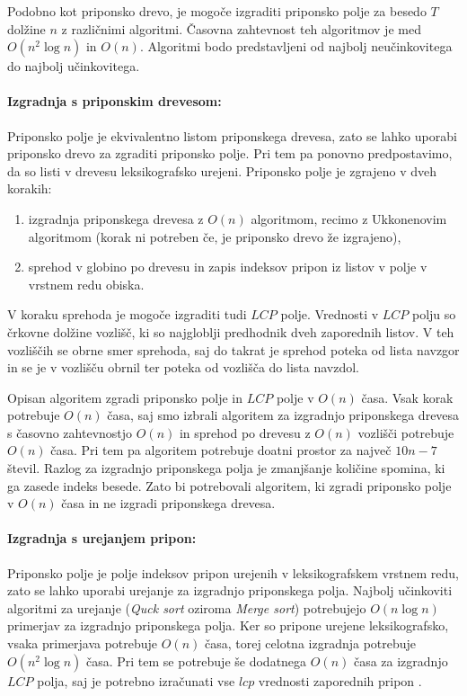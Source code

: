 Podobno kot priponsko drevo, je mogoče izgraditi priponsko polje za besedo $T$ dolžine $n$ z različnimi algoritmi. Časovna zahtevnost teh algoritmov je med $O(n^2\log{n})$ in $O(n)$. Algoritmi bodo predstavljeni od najbolj neučinkovitega do najbolj učinkovitega.

\paragraph{Izgradnja s priponskim drevesom:}
Priponsko polje je ekvivalentno listom priponskega drevesa, zato se lahko uporabi priponsko drevo za zgraditi priponsko polje. Pri tem pa ponovno predpostavimo, da so listi v drevesu leksikografsko urejeni. Priponsko polje je zgrajeno v dveh korakih:

\begin{enumerate}
    \item izgradnja priponskega drevesa z $O(n)$ algoritmom, recimo z Ukkonenovim algoritmom (korak ni potreben če, je priponsko drevo že izgrajeno),
    \item sprehod v globino po drevesu in zapis indeksov pripon iz listov v polje v vrstnem redu obiska. %
\end{enumerate}
V koraku sprehoda je mogoče izgraditi tudi $LCP$ polje. Vrednosti v $LCP$ polju so črkovne dolžine vozlišč, ki so najgloblji predhodnik dveh zaporednih listov. V teh vozliščih se obrne smer sprehoda, saj do takrat je sprehod poteka od lista navzgor in se je v vozlišču obrnil ter poteka od vozlišča do lista navzdol.

Opisan algoritem zgradi priponsko polje in $LCP$ polje v $O(n)$ časa. Vsak korak potrebuje $O(n)$ časa, saj smo izbrali algoritem za izgradnjo priponskega drevesa s časovno zahtevnostjo $O(n)$ in sprehod po drevesu z $O(n)$ vozlišči potrebuje $O(n)$ časa. Pri tem pa algoritem potrebuje doatni prostor za največ $10n-7$ števil. Razlog za izgradnjo priponskega polja je zmanjšanje količine spomina, ki ga zasede indeks besede. Zato bi potrebovali algoritem, ki zgradi priponsko polje v $O(n)$ časa in ne izgradi priponskega drevesa.

\paragraph{Izgradnja s urejanjem pripon:}
Priponsko polje je polje indeksov pripon urejenih v leksikografskem vrstnem redu, zato se lahko uporabi urejanje za izgradnjo priponskega polja. Najbolj učinkoviti algoritmi za urejanje (\textit{Quck sort} oziroma \textit{Merge sort}) potrebujejo $O(n\log{n})$ primerjav za izgradnjo priponskega polja. Ker so pripone urejene leksikografsko, vsaka primerjava potrebuje $O(n)$ časa, torej celotna izgradnja potrebuje $O(n^2\log{n})$ časa. Pri tem se potrebuje še dodatnega $O(n)$ časa za izgradnjo $LCP$ polja, saj je potrebno izračunati vse $lcp$ vrednosti zaporednih pripon \cite{Kasai2001}.

